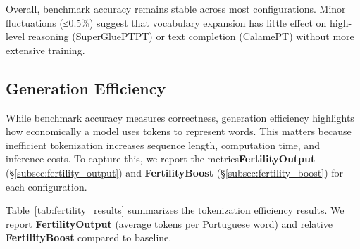 Overall, benchmark accuracy remains stable across most configurations. Minor fluctuations (≤0.5\%) suggest that vocabulary expansion has little effect on high-level reasoning (SuperGluePTPT) or text completion (CalamePT) without more extensive training.


\subsection{Generation Efficiency}
\label{sec:gen_efficiency}

While benchmark accuracy measures correctness, generation efficiency highlights how economically a model uses tokens to represent words. This matters because inefficient tokenization increases sequence length, computation time, and inference costs. To capture this, we report the metrics\textbf{FertilityOutput} (\S\ref{subsec:fertility_output}) and \textbf{FertilityBoost} (\S\ref{subsec:fertility_boost}) for each configuration.

Table~\ref{tab:fertility_results} summarizes the tokenization efficiency results. We report \textbf{FertilityOutput} (average tokens per Portuguese word) and relative \textbf{FertilityBoost} compared to baseline.

